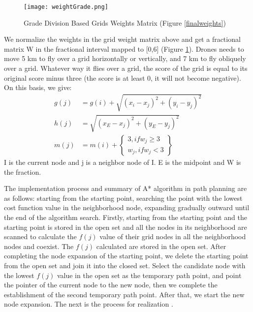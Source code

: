 \documentclass{mcmthesis}
\begin{document}
  \begin{figure}[H]                                         
 	\centering
 	\texttt{[image: weightGrade.png]}        
 	\caption{Grade Division Based Grids Weights Matrix (Figure \ref{finalweights})}                          
 	\label{gdbo}                                          
 \end{figure}
We normalize the weights in the grid weight matrix above and get a fractional matrix W in the fractional interval mapped to [0,6] (Figure \ref{gdbo}). Drones needs to move 5 km to fly over a grid horizontally or vertically, and 7 km to fly obliquely over a grid. Whatever way it flies over a grid, the score of the grid is equal to its original score minus three (the score is at least 0, it will not become negative). On this basis, we give: 
\begin{align}
g(j) &= g(i) + \sqrt {{{({x_i} - {x_j})}^2} + {{({y_i} - {y_j})}^2}} \\
h(j) &= \sqrt {{{({x_E} - {x_j})}^2} + {{({y_E} - {y_j})}^2}} \\
m(j) &= m(i) + \left\{ \begin{array}{l}
3,if{w_j} \ge 3\\
{w_j},if{w_j} < 3 
\end{array} \right\}
\end{align}
 I is the current node and j is a neighbor node of I. E is the midpoint and W is the fraction. \par
 The implementation process and summary of A* algorithm in path planning are as follows: starting from the starting point, searching the point with the lowest cost function value in the neighborhood node, expanding gradually outward until the end of the algorithm search. Firstly, starting from the starting point and the starting point is stored in the open set and all the nodes in its neighborhood are scanned to calculate the $f(j)$ value of their grid nodes in all the neighborhood nodes and coexist. The $f(j)$ calculated are stored in the open set. After completing the node expansion of the starting point, we delete the starting point from the open set and join it into the closed set. Select the candidate node with the lowest $f(j)$ value in the open set as the temporary path point, and point the pointer of the current node to the new node, then we complete the establishment of the second temporary path point. After that, we start the new node expansion. The next is the process for realization \cite{7}.
 
\end{document}
